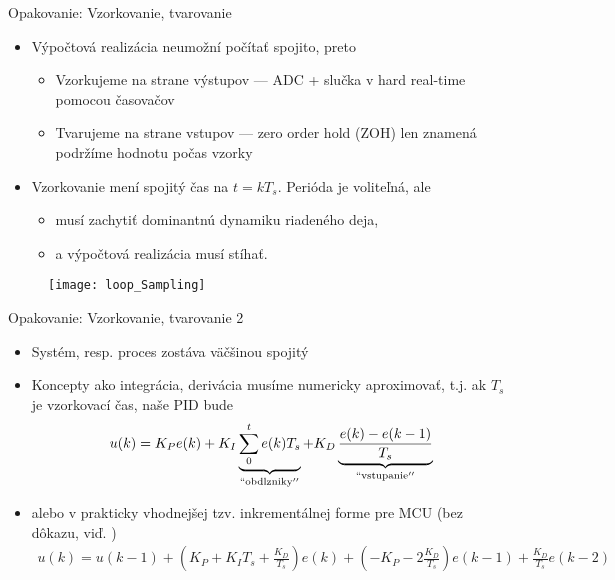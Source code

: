 \documentclass{beamer}
\begin{document}
\begin{frame}[t]{Opakovanie: Vzorkovanie, tvarovanie}
  \begin{itemize}
  \item<1-> Výpočtová realizácia neumožní počítať spojito, preto
    \begin{itemize}
      \item Vzorkujeme na strane výstupov --- ADC + slučka v hard real-time pomocou časovačov
      \item Tvarujeme na strane vstupov --- zero order hold (ZOH) len znamená podržíme hodnotu počas vzorky
    \end{itemize}
  \item<2-> Vzorkovanie mení spojitý čas na $t=kT_s$. Perióda je voliteľná, ale
    \begin{itemize}
      \item musí zachytiť dominantnú dynamiku riadeného deja,
      \item a výpočtová realizácia musí stíhať.
  \end{itemize}
\end{itemize}
\begin{figure}
\centering
  \texttt{[image: loop\_Sampling]}\\
\end{figure}
\end{frame}


\begin{frame}[t]{Opakovanie: Vzorkovanie, tvarovanie 2}
  \begin{itemize}
    \item<1-> Systém, resp. proces zostáva väčšinou spojitý
    \item<2-> Koncepty ako integrácia, derivácia musíme numericky aproximovať, t.j. ak $T_s$ je vzorkovací čas, naše PID bude
        \begin{align}
        u(k)= K_Pe(k)+K_I\underbrace{\sum_0^te(k)T_s}_{\mathrm{``obdlzniky''}}+K_D\underbrace{\frac{e(k)-e(k-1)}{T_s}}_{\mathrm{``vstupanie''}}
        \end{align}
    \item<3->  alebo v prakticky vhodnejšej tzv. inkrementálnej forme pre MCU (bez dôkazu, viď. \cite{W:PID})
        {\tiny
        \begin{align}
        u(k)=u(k-1)+\left(K_P+K_IT_s+\frac{K_D}{T_s}\right)e(k)+\left(-K_P -2\frac{K_D}{T_s}\right)e(k-1)+\frac{K_D}{T_s}e(k-2)
         \end{align}
         }
\end{itemize}
\end{frame}
\end{document}
